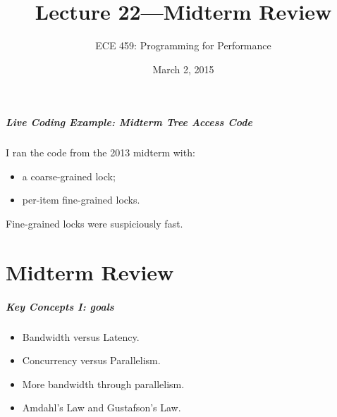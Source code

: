 \documentclass[aspectratio=43]{beamer}
\title{Lecture 22---Midterm Review}
\subtitle{ECE 459: Programming for Performance}
\date{March 2, 2015}
\newenvironment{changemargin}[1]{%
  \begin{list}{}{%
    \setlength{\topsep}{0pt}%
    \setlength{\leftmargin}{#1}%
    \setlength{\rightmargin}{1em}
    \setlength{\listparindent}{\parindent}%
    \setlength{\itemindent}{\parindent}%
    \setlength{\parsep}{\parskip}%
  }%
  \item[]}{\end{list}}
\begin{document}
\begin{frame}[plain]
  \titlepage
\end{frame}

\begin{frame}
  \frametitle{Live Coding Example: Midterm Tree Access Code}

  \begin{changemargin}{1cm}
    I ran the code from the 2013 midterm with:
    \begin{itemize}
    \item a coarse-grained lock;
    \item per-item fine-grained locks.
    \end{itemize}
    Fine-grained locks were suspiciously fast.
    
  \end{changemargin}

\end{frame}

\part{Midterm Review}
\frame{\partpage}


\begin{frame}
  \frametitle{Key Concepts I: goals}

  \begin{changemargin}{2cm}
  \begin{itemize}
  \item Bandwidth versus Latency.

  \item Concurrency versus Parallelism.

  \item More bandwidth through parallelism.

  \item Amdahl's Law and Gustafson's Law.
  \end{itemize}
  \end{changemargin}
\end{frame}
\end{document}
